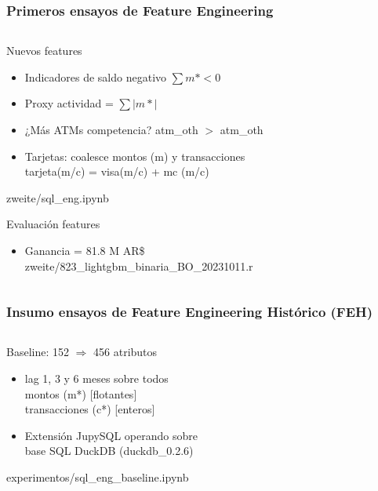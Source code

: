 \documentclass[aspectratio=169]{beamer} %
\begin{document}
\begin{frame}
  \frametitle{Primeros ensayos de Feature Engineering}
  \begin{columns}[onlytextwidth]
    \begin{column}{.6\textwidth}
      \begin{block}{Nuevos features}
        \begin{itemize}
          \item Indicadores de saldo negativo $\sum m* < 0$
          \item Proxy actividad = $\sum |m*|$
          \item ¿Más ATMs competencia? atm\_oth $>$ atm\_oth
          \item Tarjetas: coalesce montos (m) y transacciones\\
           tarjeta(m/c) = visa(m/c) + mc (m/c)
        \end{itemize}
        {\tiny zweite/sql\_eng.ipynb}
      \end{block}
      \begin{block}{Evaluación features}
        \begin{itemize}
          \item Ganancia = 81.8 M AR\$\\
          {\tiny zweite/823\_lightgbm\_binaria\_BO\_20231011.r}
        \end{itemize}
      \end{block}
   \end{column}
  \end{columns}
\end{frame}





\begin{frame}
  \frametitle{Insumo ensayos de Feature Engineering Histórico (FEH)}
  \begin{columns}[onlytextwidth]
    \begin{column}{.6\textwidth}
      \begin{block}{Baseline: 152 $\Rightarrow$ 456 atributos}
        \begin{itemize}
          \item lag 1, 3 y 6 meses sobre todos\\
          montos (m*) [flotantes]\\
          transacciones (c*) [enteros]
          \item Extensión JupySQL operando sobre\\base SQL DuckDB {\tiny (duckdb\_0.2.6)}
		    \end{itemize}
        {\tiny experimentos/sql\_eng\_baseline.ipynb}
      \end{block}

   \end{column}
  \end{columns}
\end{frame}
\end{document}
